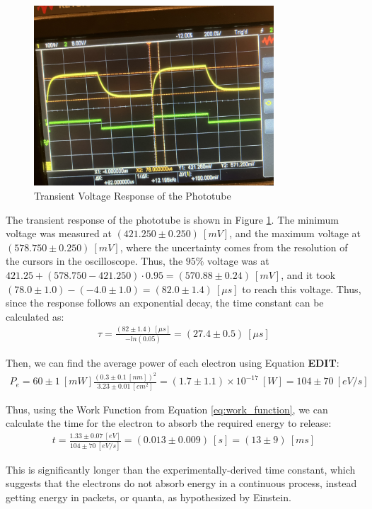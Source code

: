 \begin{figure}
    \centering
    \includegraphics[width=0.8\textwidth]{Results/Part3/V_Func.jpg}
    \caption{Transient Voltage Response of the Phototube}
    \label{fig:V_Func}
\end{figure}

The transient response of the phototube is shown in Figure \ref{fig:V_Func}. The minimum voltage was measured at $(421.250 \pm 0.250)~[mV]$, and the maximum voltage at $(578.750 \pm 0.250)~[mV]$, where the uncertainty comes from the resolution of the cursors in the oscilloscope. Thus, the $95\%$ voltage was at $421.25 + (578.750-421.250) \cdot 0.95 = (570.88 \pm 0.24)~[mV]$, and it took $(78.0 \pm 1.0) - (-4.0 \pm 1.0) = (82.0 \pm 1.4)~[\mu s]$ to reach this voltage. Thus, since the response follows an exponential decay, the time constant can be calculated as:
\begin{gather*}
    \tau = \frac{(82 \pm 1.4)~[\mu s]}{-ln(0.05)} = (27.4 \pm 0.5)~[\mu s]
\end{gather*}

 Then, we can find the average power of each electron using Equation \textbf{EDIT}:
\begin{gather*}
    P_e = 60\pm1~[mW] \frac{(0.3 \pm 0.1~[nm])^2}{3.23\pm 0.01~[cm^2]} = (1.7 \pm 1.1) \times 10^{-17}~[W] = 104 \pm 70~[eV/s]
\end{gather*}

Thus, using the Work Function from Equation \ref{eq:work_function}, we can calculate the time for the electron to absorb the required energy to release:
\begin{gather*}
    t = \frac{1.33 \pm 0.07~[eV]}{104 \pm 70~[eV/s]} = (0.013 \pm 0.009)~[s] = (13 \pm 9)~[ms]
\end{gather*}

This is significantly longer than the experimentally-derived time constant, which suggests that the electrons do not absorb energy in a continuous process, instead getting energy in packets, or quanta, as hypothesized by Einstein.